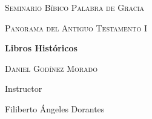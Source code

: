 
%

\begin{titlepage}
	\begin{center}
		\vspace*{1cm}
		{\scshape\LARGE Seminario Bíbico Palabra de Gracia \par}
		\vspace{1cm}
		{\scshape\LARGE Panorama del Antiguo Testamento I \par}
		\vspace{1.5cm}
		{\huge\bfseries Libros Históricos \par}
		\vspace{2cm}
		{\Large\scshape Daniel Godínez Morado \par}
		\vfill
		Instructor\par
		Filiberto Ángeles Dorantes
		\vfill

		{\large {}}
	\end{center}

\end{titlepage}
%


